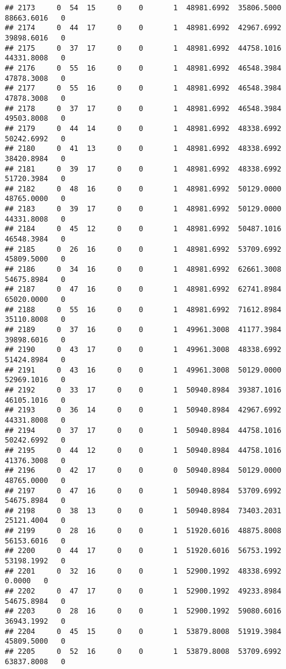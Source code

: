 \documentclass[
]{article}
\begin{document}
\begin{enumerate}
\begin{verbatim}
## 2173     0  54  15     0    0       1  48981.6992  35806.5000  88663.6016   0
## 2174     0  44  17     0    0       1  48981.6992  42967.6992  39898.6016   0
## 2175     0  37  17     0    0       1  48981.6992  44758.1016  44331.8008   0
## 2176     0  55  16     0    0       1  48981.6992  46548.3984  47878.3008   0
## 2177     0  55  16     0    0       1  48981.6992  46548.3984  47878.3008   0
## 2178     0  37  17     0    0       1  48981.6992  46548.3984  49503.8008   0
## 2179     0  44  14     0    0       1  48981.6992  48338.6992  50242.6992   0
## 2180     0  41  13     0    0       1  48981.6992  48338.6992  38420.8984   0
## 2181     0  39  17     0    0       1  48981.6992  48338.6992  51720.3984   0
## 2182     0  48  16     0    0       1  48981.6992  50129.0000  48765.0000   0
## 2183     0  39  17     0    0       1  48981.6992  50129.0000  44331.8008   0
## 2184     0  45  12     0    0       1  48981.6992  50487.1016  46548.3984   0
## 2185     0  26  16     0    0       1  48981.6992  53709.6992  45809.5000   0
## 2186     0  34  16     0    0       1  48981.6992  62661.3008  54675.8984   0
## 2187     0  47  16     0    0       1  48981.6992  62741.8984  65020.0000   0
## 2188     0  55  16     0    0       1  48981.6992  71612.8984  35110.8008   0
## 2189     0  37  16     0    0       1  49961.3008  41177.3984  39898.6016   0
## 2190     0  43  17     0    0       1  49961.3008  48338.6992  51424.8984   0
## 2191     0  43  16     0    0       1  49961.3008  50129.0000  52969.1016   0
## 2192     0  33  17     0    0       1  50940.8984  39387.1016  46105.1016   0
## 2193     0  36  14     0    0       1  50940.8984  42967.6992  44331.8008   0
## 2194     0  37  17     0    0       1  50940.8984  44758.1016  50242.6992   0
## 2195     0  44  12     0    0       1  50940.8984  44758.1016  41376.3008   0
## 2196     0  42  17     0    0       0  50940.8984  50129.0000  48765.0000   0
## 2197     0  47  16     0    0       1  50940.8984  53709.6992  54675.8984   0
## 2198     0  38  13     0    0       1  50940.8984  73403.2031  25121.4004   0
## 2199     0  28  16     0    0       1  51920.6016  48875.8008  56153.6016   0
## 2200     0  44  17     0    0       1  51920.6016  56753.1992  53198.1992   0
## 2201     0  32  16     0    0       1  52900.1992  48338.6992      0.0000   0
## 2202     0  47  17     0    0       1  52900.1992  49233.8984  54675.8984   0
## 2203     0  28  16     0    0       1  52900.1992  59080.6016  36943.1992   0
## 2204     0  45  15     0    0       1  53879.8008  51919.3984  45809.5000   0
## 2205     0  52  16     0    0       1  53879.8008  53709.6992  63837.8008   0

\end{verbatim}
\end{enumerate}
\end{document}
